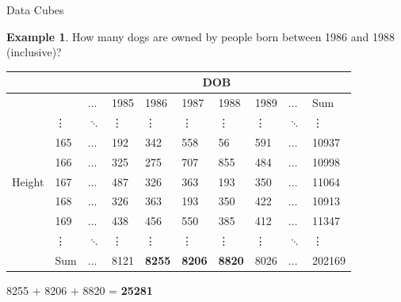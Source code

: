 \documentclass{beamer}
\theoremstyle{definition}
\newtheorem{myexample}{Example}
\theoremstyle{definition}
\begin{document}
\begin{frame}{Data Cubes}
    \begin{myexample}
        How many dogs are owned by people born between 1986 and 1988 (inclusive)?
    \end{myexample}

    \begin{table}[h]\footnotesize
        \begin{tabular} { | l | l | l | l | l | l | l | l | l | l |}
        \hline
        & & \multicolumn{8}{|c|}{DOB} \\ \hline
        & & $\hdots$ & 1985 & 1986 & 1987 & 1988 & 1989 & $\hdots$ & Sum \\ \hline
        \multirow{7}{*}{Height}
        & \vdots & $\ddots$ & \vdots & \vdots & \vdots & \vdots & \vdots & $\ddots$ & \vdots \\
        & 165 & $\hdots$ & 192 & 342 & 558 & 56 & 591 & $\hdots$ & 10937 \\
        & 166 & $\hdots$ & 325 & 275 & 707 & 855 & 484 & $\hdots$ & 10998 \\
        & 167 & $\hdots$ & 487 & 326 & 363 & 193 & 350 & $\hdots$ & 11064 \\
        & 168 & $\hdots$ & 326 & 363 & 193 & 350 & 422 & $\hdots$ & 10913 \\
        & 169 & $\hdots$ & 438 & 456 & 550 & 385 & 412 & $\hdots$ & 11347 \\
        & \vdots & $\ddots$ & \vdots & \vdots & \vdots & \vdots & \vdots & $\ddots$ & \vdots \\
        & Sum & $\hdots$ & 8121 & \textbf{8255} & \textbf{8206} & \textbf{8820} & 8026 & $\hdots$ & 202169 \\
        \hline
        \end{tabular}
    \end{table}
    8255 + 8206 + 8820 = \textbf{25281}
\end{frame}
\end{document}
